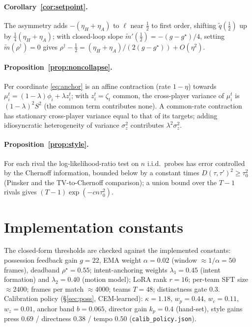 \documentclass[11pt]{article}
\theoremstyle{definition}
\theoremstyle{remark}
\begin{document}
\paragraph{Corollary~\ref{cor:setpoint}.} The asymmetry adds $-(\eta_H+\eta_A)$ to $\ell$ near $\tfrac12$ to first order, shifting $\tilde q(\tfrac12)$ up by $\tfrac14(\eta_H+\eta_A)$; with closed-loop slope $\tilde m'(\tfrac12)=-(g-g^\star)/4$, setting $\tilde m(\rho^\dagger)=0$ gives $\rho^\dagger-\tfrac12=(\eta_H+\eta_A)/(2(g-g^\star))+O(\eta^2)$.

\paragraph{Proposition~\ref{prop:noncollapse}.} Per coordinate \eqref{eq:anchor} is an affine contraction (rate $1-\eta$) towards $\mu_i^t=(1-\lambda)\phi_i+\lambda z_i^t$; with $z_i^t=\zeta_t$ common, the cross-player variance of $\mu_i^t$ is $(1-\lambda)^2S^2$ (the common term contributes none). A common-rate contraction has stationary cross-player variance equal to that of its targets; adding idiosyncratic heterogeneity of variance $\sigma_z^2$ contributes $\lambda^2\sigma_z^2$.

\paragraph{Proposition~\ref{prop:style}.} For each rival the log-likelihood-ratio test on $n$ i.i.d.\ probes has error controlled by the Chernoff information, bounded below by a constant times $D(\tau,\tau')^2\ge\tau_0^2$ (Pinsker and the TV-to-Chernoff comparison); a union bound over the $T-1$ rivals gives $(T-1)\exp(-cn\tau_0^2)$.

\section{Implementation constants}\label{app:consts}
The closed-form thresholds are checked against the implemented constants: possession feedback gain $g=22$, EMA weight $\alpha=0.02$ (window $\approx1/\alpha=50$ frames), deadband $\rho^\star=0.55$; intent-anchoring weights $\lambda_1=0.45$ (intent formation) and $\lambda_2=0.40$ (motion model); LoRA rank $r=16$; per-team SFT size $\approx2400$; frames per match $\approx4000$; teams $T=48$; distinctness gate $0.3$. Calibration policy (\S\ref{sec:poss}, CEM-learned): $\kappa=1.18$, $w_p=0.44$, $w_c=0.11$, $w_z=0.01$, anchor band $b=0.065$, director gain $k_p=0.4$ (hand-set), style gains press $0.69$ / directness $0.38$ / tempo $0.50$ (\texttt{calib\_policy.json}).
\end{document}
